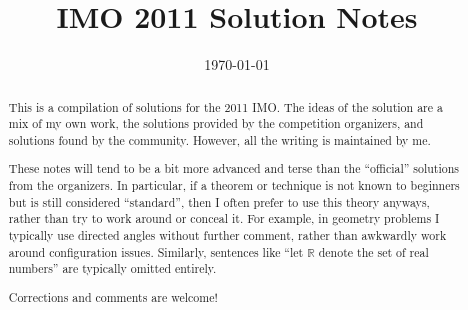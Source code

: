 \documentclass[11pt]{scrartcl}
\title{IMO 2011 Solution Notes}
\date{\today}
\begin{document}
\maketitle

\begin{abstract}
This is a compilation of solutions
for the 2011 IMO.
The ideas of the solution are a mix of my own work,
the solutions provided by the competition organizers,
and solutions found by the community.
However, all the writing is maintained by me.

These notes will tend to be a bit more advanced and terse than the ``official''
solutions from the organizers.
In particular, if a theorem or technique is not known to beginners
but is still considered ``standard'', then I often prefer to
use this theory anyways, rather than try to work around or conceal it.
For example, in geometry problems I typically use directed angles
without further comment, rather than awkwardly work around configuration issues.
Similarly, sentences like ``let $\mathbb{R}$ denote the set of real numbers''
are typically omitted entirely.

Corrections and comments are welcome!
\end{abstract}

\tableofcontents
\newpage

\addtocounter{section}{-1}
\end{document}

